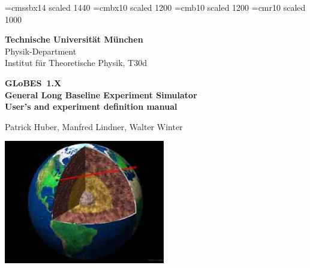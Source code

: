 \documentclass[a4paper,12pt,twoside]{book}
\newcommand{\GLOBES}{{\sf GLoBES}}
\begin{document}
 

\thispagestyle{empty}
{
\setlength{\parindent}{0cm}


\font\fa=cmssbx14 scaled 1440
\font\fb=cmbx10 scaled 1200
\font\fc=cmb10 scaled 1200
\font\fd=cmr10 scaled 1000  

{\setlength{\baselineskip}{1.2cm}}



\begin{minipage}{7cm}
\begin{center}
{\bf Technische Universit{\"a}t M{\"u}nchen} \\
Physik-Department \\
Institut f{\"u}r Theoretische Physik, T30d \\
\end{center}
\end{minipage}

\vspace{-2cm}

\hfill \oTUM{3.5cm}

\vspace{3cm}

\begin{center}
{ \Large \bf
\GLOBES\ 1.X \\
General Long Baseline Experiment Simulator \\ }
\vspace*{0.5cm}
{\large \bf User's and experiment definition manual }

\end{center}

\vspace{1cm}

\begin{center}
{\large Patrick Huber, Manfred Lindner, Walter Winter}
\end{center}

\vspace{1cm}

\begin{center}
\colorbox{black}{\includegraphics[width=7cm]{earthint}}


\end{center}}
\end{document}
